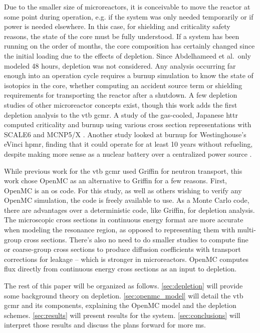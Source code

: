 \documentclass[letterpaper]{physor2024}
\begin{document}
Due to the smaller size of microreactors, it is conceivable to move the reactor at some point during operation, e.g. if the system was only needed temporarily or if power is needed elsewhere. In this case, for shielding and criticality safety reasons, the state of the core must be fully understood. If a system has been running on the order of months, the core composition has certainly changed since the initial loading due to the effects of depletion. Since Abdelhameed et al.~only modeled 48 hours, depletion was not considered. Any analysis occurring far enough into an operation cycle requires a burnup simulation to know the state of isotopics in the core, whether computing an accident source term or shielding requirements for transporting the reactor after a shutdown. A few depletion studies of other microreactor concepts exist, though this work adds the first depletion analysis to the \gls{vtb} \gls{gcmr}. A study of the gas-cooled, Japanese \gls{httr} computed criticality and burnup using various cross section representations with SCALE6 and MCNP5/X \cite{chiang-gcmr}. Another study looked at burnup for Westinghouse's eVinci \gls{hpmr}, finding that it could operate for at least 10 years without refueling, despite making more sense as a nuclear battery over a centralized power source \cite{Hernandez-hpmr}.

While previous work for the \gls{vtb} \gls{gcmr} used Griffin for neutron transport, this work chose OpenMC as an alternative to Griffin for a few reasons. First, OpenMC is an \gls{os} code. For this study, as well as others wishing to verify any OpenMC simulation, the code is freely available to use. As a Monte Carlo code, there are advantages over a deterministic code, like Griffin, for depletion analysis. The microscopic cross sections in continuous energy format are more accurate when modeling the resonance region, as opposed to representing them with multi-group cross sections. There's also no need to do smaller studies to compute fine or coarse-group cross sections to produce diffusion coefficients with transport corrections for leakage -- which is stronger in microreactors. OpenMC computes flux directly from continuous energy cross sections as an input to depletion.

The rest of this paper will be organized as follows. \cref{sec:depletion} will provide some background theory on depletion. \cref{sec:openmc_model}  will detail the \gls{vtb} \gls{gcmr} and its components, explaining the OpenMC model and the depletion schemes. \cref{sec:results} will present results for the system. \cref{sec:conclusions} will interpret those results and discuss the plans forward for more \gls{ms}.
\end{document}
